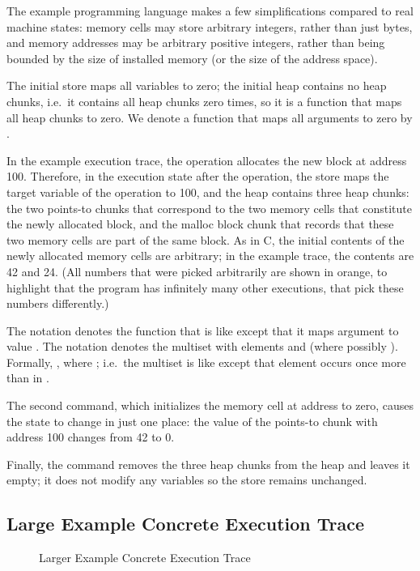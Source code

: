\documentclass{CSML}
\newenvironment{changemargin}[2]{}{}
\theoremstyle{definition}\newtheorem{notation}[thm]{Notation}
\theoremstyle{plain}\newtheorem{satz}[thm]{Satz}
\begin{document}
The example programming language makes a few simplifications 
compared to real machine states: memory cells may store 
arbitrary integers, rather than just bytes, and memory 
addresses may be arbitrary positive integers, rather than being 
bounded by the size of installed memory (or the size of the 
address space).

The initial store maps all variables to zero; the initial heap 
contains no heap chunks, i.e.~it contains all heap chunks zero 
times, so it is a function that maps all heap chunks to zero. 
We denote a function that maps all arguments to zero by 
.

In the example execution trace, the  operation 
allocates the new block at address 100. Therefore, in the 
execution state after the  operation, the 
store maps the target variable  of the 
 operation to 100, and the heap contains three 
heap chunks: the two points-to chunks that correspond to the 
two memory cells that constitute the newly allocated block, and 
the malloc block chunk that records that these two memory cells 
are part of the same block. As in C, the initial contents of 
the newly allocated memory cells are arbitrary; in the example 
trace, the contents are 42 and 24. (All numbers that were 
picked arbitrarily are shown in orange, to highlight that the 
program has infinitely many other executions, that pick these 
numbers differently.)

The notation  denotes the function that is like  
except that it maps argument  to value . The notation 
 denotes the multiset with elements 
 and  (where possibly ). Formally, 
, where ; i.e.~the multiset  is like  except that element  occurs 
once more than in .

The second command, which initializes the memory cell at 
address  to zero, causes the state to change in 
just one place: the value of the points-to chunk with address 
100 changes from 42 to 0.

Finally, the  command removes the three heap 
chunks from the heap and leaves it empty; it does not modify 
any variables so the store remains unchanged. 

\subsection{Large Example Concrete Execution Trace}

\begin{figure}

\begin{changemargin}{-1cm}{-1cm}

\end{changemargin}

\caption{Larger Example Concrete Execution Trace}\label{fig:larger-cexec-trace}
\end{figure}
\end{document}
